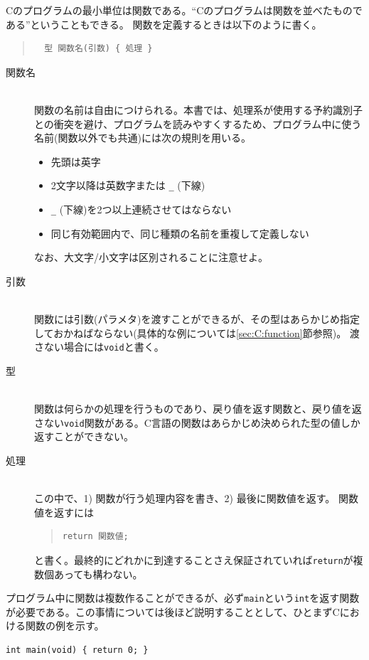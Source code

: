 Cのプログラムの最小単位は関数である。``Cのプログラムは関数を並べたものである''ということもできる。
関数を定義するときは以下のように書く。
\begin{quote}
    \begin{verbatim}
  型 関数名(引数) { 処理 }
  \end{verbatim}
\end{quote}
\begin{description}
    \item[関数名]\mbox{}\\
          関数の名前は自由につけられる。本書では、処理系が使用する予約識別子との衝突を避け、プログラムを読みやすくするため、プログラム中に使う名前(関数以外でも共通)には次の規則を用いる。
          \begin{itemize}
              \item 先頭は英字
              \item 2文字以降は英数字または \texttt{\_} (下線)
              \item \texttt{\_} (下線)を2つ以上連続させてはならない
              \item 同じ有効範囲内で、同じ種類の名前を重複して定義しない
          \end{itemize}
          なお、大文字/小文字は区別されることに注意せよ。
    \item[引数]\mbox{}\\
          関数には引数(パラメタ)を渡すことができるが、その型はあらかじめ指定しておかねばならない(具体的な例については\ref{sec:C:function}節参照)。
          渡さない場合には\texttt{void}と書く。
    \item[型]\mbox{}\\
          関数は何らかの処理を行うものであり、戻り値を返す関数と、戻り値を返さない\texttt{void}関数がある。C言語の関数はあらかじめ決められた型の値しか返すことができない。
    \item[処理]\mbox{}\\
          この中で、1) 関数が行う処理内容を書き、2) 最後に関数値を返す。
          関数値を返すには
          \begin{quote}
\begin{verbatim}
return 関数値;
\end{verbatim}
          \end{quote}
          と書く。最終的にどれかに到達することさえ保証されていれば\texttt{return}が複数個あっても構わない。
\end{description}
プログラム中に関数は複数作ることができるが、必ず\texttt{main}という\texttt{int}を返す関数が必要である。この事情については後ほど説明することとして、ひとまずCにおける関数の例を示す。
\begin{reidai}\label{ex:hinagata1}
    \begin{verbatim}
int main(void) { return 0; }
\end{verbatim}
\end{reidai}

